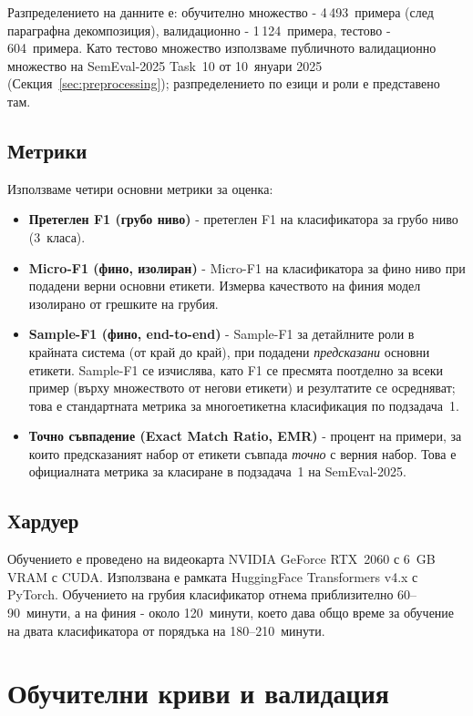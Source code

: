 \documentclass[12pt,a4paper]{report}
\begin{document}
Разпределението на данните е: обучително множество - 4\,493~примера (след параграфна декомпозиция), валидационно - 1\,124~примера, тестово - 604~примера. Като тестово множество използваме публичното валидационно множество на SemEval-2025 Task~10 от 10~януари 2025 (Секция~\ref{sec:preprocessing}); разпределението по езици и роли е представено там.

\subsection{Метрики}

Използваме четири основни метрики за оценка:
\begin{itemize}
  \item \textbf{Претеглен F1 (грубо ниво)} - претеглен F1 на класификатора за грубо ниво (3~класа).
  \item \textbf{Micro-F1 (фино, изолиран)} - Micro-F1 на класификатора за фино ниво при подадени верни основни етикети. Измерва качеството на финия модел изолирано от грешките на грубия.
  \item \textbf{Sample-F1 (фино, end-to-end)} - Sample-F1 за детайлните роли в крайната система (от край до край), при подадени \textit{предсказани} основни етикети. Sample-F1 се изчислява, като F1 се пресмята поотделно за всеки пример (върху множеството от негови етикети) и резултатите се осредняват; това е стандартната метрика за многоетикетна класификация по подзадача~1.
  \item \textbf{Точно съвпадение (Exact Match Ratio, EMR)} - процент на примери, за които предсказаният набор от етикети съвпада \textit{точно} с верния набор. Това е официалната метрика за класиране в подзадача~1 на SemEval-2025.
\end{itemize}

\subsection{Хардуер}
\label{sec:hardware}

Обучението е проведено на видеокарта NVIDIA GeForce RTX~2060 с 6~GB VRAM с CUDA. Използвана е рамката HuggingFace Transformers \cite{wolf2020transformers} v4.x с PyTorch. Обучението на грубия класификатор отнема приблизително 60--90~минути, а на финия - около 120~минути, което дава общо време за обучение на двата класификатора от порядъка на 180--210~минути.


\section{Обучителни криви и валидация}
\label{sec:training_process}
\end{document}
